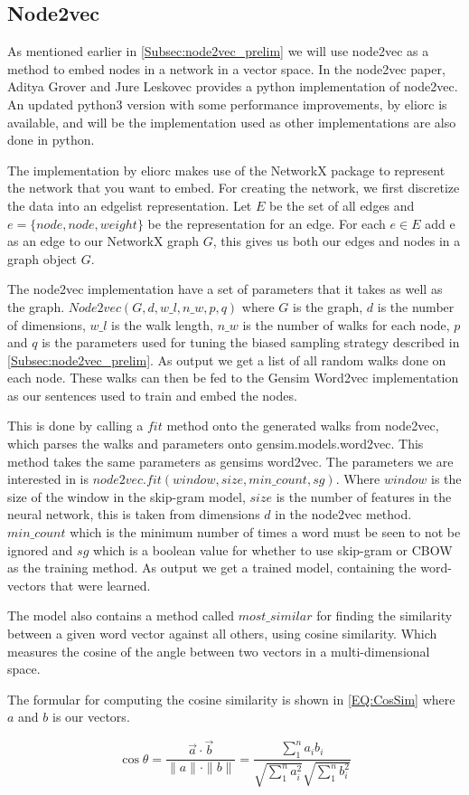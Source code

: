 \subsection{Node2vec}
\label{Subsec:n2v_implementation}
As mentioned earlier in \ref{Subsec:node2vec_prelim} we will use node2vec as a method to embed nodes in a network in a vector space. In the node2vec paper, Aditya Grover and Jure Leskovec provides a python implementation of node2vec. An updated python3 version with some performance improvements, by eliorc\cite{n2v.eliorc} is available, and will be the implementation used as other implementations are also done in python.

The implementation by eliorc makes use of the NetworkX package to represent the network that you want to embed. For creating the network, we first discretize the data into an edgelist representation. Let $E$ be the set of all edges and $e = \{node, node, weight\}$ be the representation for an edge. For each $e \in E$ add e as an edge to our NetworkX graph $G$, this gives us both our edges and nodes in a graph object $G$.

The node2vec implementation have a set of parameters that it takes as well as the graph. $Node2vec(G, d, w\_l, n\_w, p, q)$ where $G$ is the graph, $d$ is the number of dimensions, $w\_l$ is the walk length, $n\_w$ is the number of walks for each node, $p$ and $q$ is the parameters used for tuning the biased sampling strategy described in \ref{Subsec:node2vec_prelim}. As output we get a list of all random walks done on each node. These walks can then be fed to the Gensim Word2vec\cite{Gensim.Word2vec} implementation as our sentences used to train and embed the nodes.

This is done by calling a $fit$ method onto the generated walks from node2vec, which parses the walks and parameters onto gensim.models.word2vec\cite{Gensim.Word2vec}. This method takes the same parameters as gensims word2vec. The parameters we are interested in is $node2vec.fit(window, size, min\_count, sg)$. Where $window$ is the size of the window in the skip-gram model, $size$ is the number of features in the neural network, this is taken from dimensions $d$ in the node2vec method. $min\_count$ which is the minimum number of times a word must be seen to not be ignored and $sg$ which is a boolean value for whether to use skip-gram or CBOW as the training method. As output we get a trained model, containing the word-vectors that were learned.

The model also contains a method called $most\_similar$ for finding the similarity between a given word vector against all others, using cosine similarity. Which measures the cosine of the angle between two vectors in a multi-dimensional space.

The formular for computing the cosine similarity is shown in \ref{EQ:CosSim} where $a$ and $b$ is our vectors.

\begin{equation}\label{EQ:CosSim}
\cos\theta =
\frac{\vec{a}\cdot\vec{b}}{\parallel a\parallel
\cdot\parallel b\parallel} =
\frac{\sum_1^n a_i b_i}{\sqrt{\sum_1^n a_i^2}\sqrt{\sum_1^n b_i^2}}
\end{equation}
